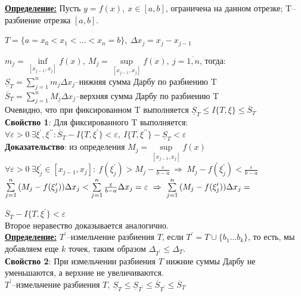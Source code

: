 \documentclass[a4paper,12pt]{article} %
\begin{document}
\underline{\textbf{Определение:}} Пусть $y = f(x),~x\in [a,b]$, ограничена на данном отрезке; T--разбиение отрезка $[a,b]$.

$ T = \{a = x_0 < x_1 < {\dots} < x_n = b\},~\Delta x_j = x_j - x_{j-1} $

$m_j = \inf\limits_{[x_{j-1},x_j]}f(x),~M_j = \sup\limits_{[x_{j-1},x_j]}f(x),~j = \overline{1,n}$, тогда:\\

$\underline{S}_T = \sum\limits_{j = 1}^{n}{m_j \Delta x_j}$--нижняя сумма Дарбу по разбиению T\\

$\overline{S}_T = \sum\limits_{j = 1}^{n}{M_j \Delta x_j}$--верхняя сумма Дарбу по разбиению T\\

Очевидно, что при фиксированном T выполняется $\underline{S}_T \leq  I\{T,\xi\} \leq \overline{S}_T$\\

\textbf{Свойство 1}: Для фиксированного T выполняется:\\
$\forall\varepsilon>0~\exists \xi^{\prime}, \xi^{\prime \prime}: \overline{S}_T - I\{T,\xi^{\prime}\}<\varepsilon,~I\{T,\xi^{\prime\prime}\}-\underline{S}_T<\varepsilon$\\

\textbf{Доказательство}: из определения $M_j = \sup\limits_{[x_{j-1},x_j]}f(x)$\\
$\forall\varepsilon>0~\exists \xi^{\prime}_j \in [x_{j-1},x_j]:~f(\xi^{\prime}_j)>M_j-\frac{\varepsilon}{b-a}~\Rightarrow~M_j-f(\xi^{\prime}_j)<\frac{\varepsilon}{b-a}$\\

$\sum\limits_{j = 1}^{n} {(M_j-f(\xi^{\prime}_j))\Delta x_j}<\sum\limits_{j = 1}^{n} {\frac{\varepsilon}{b-a}\Delta x_j} = \varepsilon~\Rightarrow~\sum\limits_{j = 1}^{n} {(M_j-f(\xi^{\prime}_j))\Delta x_j}=\\$

$\overline{S}_T - I\{T,\xi^{\prime}\}<\varepsilon$ \\
Второе неравество доказывается аналогично.\\

\underline{\textbf{Определение:}} $T^{\prime}$--измельчение разбиения $T$, если $T^{\prime}=T\cup \{b_1{\dots}b_k\}$, то есть, мы добавляем еще $k$ точек, таким образом $\Delta_{T^{\prime}}\leq \Delta_T$.\\

\textbf{Свойство 2}: При измельчении разбиения $T$ нижние суммы Дарбу не уменьшаются, а верхние не увеличиваются.\\
$T^{\prime}$--измельчение разбиения $T,~\underline{S}_T\leq \underline{S}_{T^{\prime}}\leq \overline{S}_{T^{\prime}}\leq \overline{S}_T$\\
\end{document}
